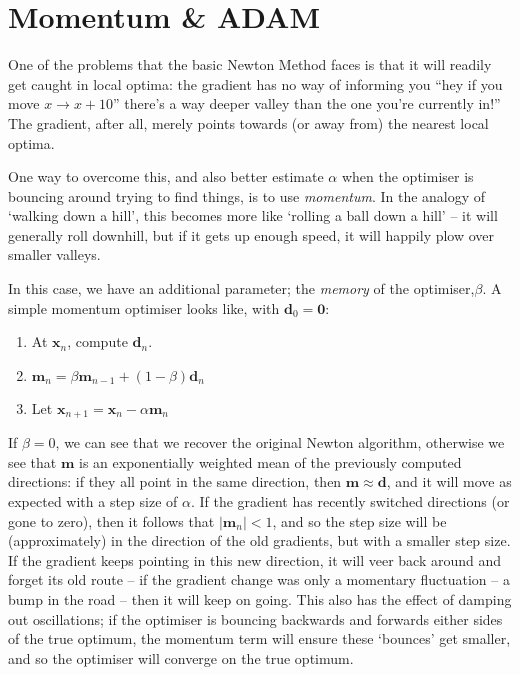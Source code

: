 \documentclass[a4paper,openany,11pt]{book}
\renewcommand\vec[1]{\boldsymbol{\mathbf{#1}}}
\begin{document}
			\section{Momentum \& ADAM}
	
				One of the problems that the basic Newton Method faces is that it will readily get caught in local optima: the gradient has no way of informing you ``hey if you move $x \to x + 10$'' there's a way deeper valley than the one you're currently in!'' The gradient, after all, merely points towards (or away from) the nearest local optima.
	
				One way to overcome this, and also better estimate $\alpha$ when the optimiser is bouncing around trying to find things, is to use \textit{momentum}. In the analogy of `walking down a hill', this becomes more like `rolling a ball down a hill' -- it will generally roll downhill, but if it gets up enough speed, it will happily plow over smaller valleys.
	
				In this case, we have an additional parameter; the \textit{memory} of the optimiser,$\beta$. A simple momentum optimiser looks like, with $\vec{d}_0 = \vec{0}$:
	
				\begin{enumerate}
					\item At $\vec{x}_n$, compute $\vec{d}_n$. 
					\item $\vec{m}_n = \beta \vec{m}_{n-1} + (1 -\beta) \vec{d}_n$
					\item Let $\vec{x}_{n+1} = \vec{x}_n - \alpha \vec{m}_n$
				\end{enumerate}
	
				If $\beta = 0$, we can see that we recover the original Newton algorithm, otherwise we see that $\vec{m}$ is an exponentially weighted mean of the previously computed directions: if they all point in the same direction, then $\vec{m} \approx \vec{d}$, and it will move as expected with a step size of $\alpha$. If the gradient has recently switched directions (or gone to zero), then it follows that $|\vec{m}_{n}| < 1$, and so the step size will be (approximately) in the direction of the old gradients, but with a smaller step size. If the gradient keeps pointing in this new direction, it will veer back around and forget its old route -- if the gradient change was only a momentary fluctuation -- a bump in the road -- then it will keep on going. This also has the effect of damping out oscillations; if the optimiser is bouncing backwards and forwards either sides of the true optimum, the momentum term will ensure these `bounces' get smaller, and so the optimiser will converge on the true optimum.
				
\end{document}
